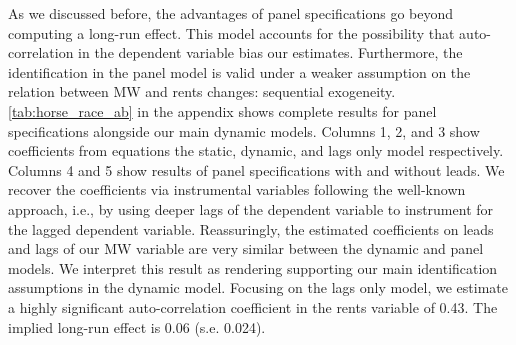 As we discussed before, the advantages of panel specifications go beyond computing a long-run effect.
This model accounts for the possibility that auto-correlation in the dependent variable bias our 
estimates. Furthermore, the identification in the panel model is valid under a weaker assumption on 
the relation between MW and rents changes: sequential exogeneity. \autoref{tab:horse_race_ab} in the 
appendix shows complete results for panel specifications alongside our main dynamic models. Columns 1, 
2, and 3 show coefficients from equations the static, dynamic, and lags only model respectively. Columns 
4 and 5 show results of panel specifications with and without leads. We recover the coefficients via 
instrumental variables following the well-known \textcite{ArellanoBond1991} approach, i.e., by using 
deeper lags of the dependent variable to instrument for the lagged dependent variable. Reassuringly, 
the estimated coefficients on leads and lags of our MW variable are very similar between the dynamic
and panel models. We interpret this result as rendering supporting our main identification assumptions
in the dynamic model. Focusing on the lags only model, we estimate a highly significant auto-correlation 
coefficient in the rents variable of 0.43. The implied long-run effect is 0.06 (s.e. 0.024).

